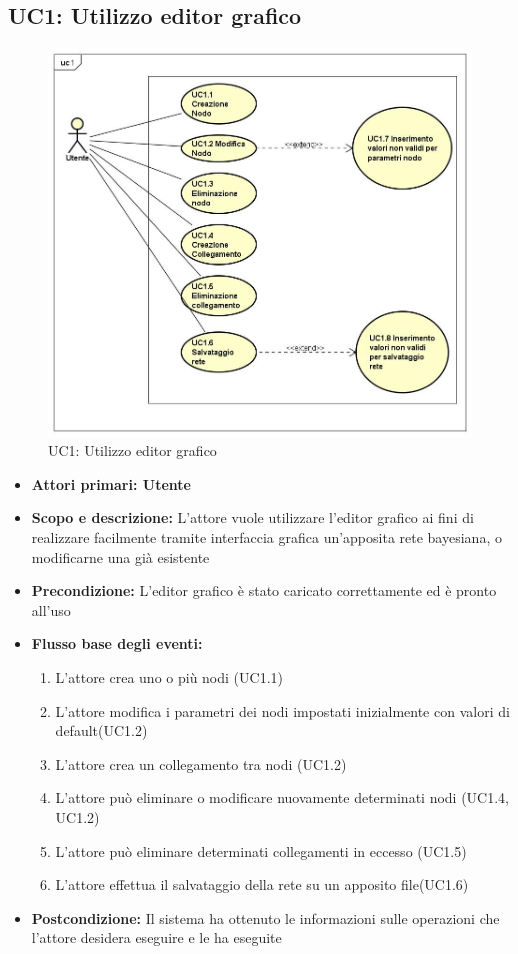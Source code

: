 \subsection{UC1: Utilizzo editor grafico} 
\begin{figure} [H]
	\centering
	\includegraphics[scale=0.45]{Img/UC1} 
	\caption{UC1: Utilizzo editor grafico} \label{} 
\end{figure} 
\begin{itemize} 
	\item{\textbf{Attori primari: Utente} } 
	\item{\textbf{Scopo e descrizione:} L'attore vuole utilizzare l'editor grafico ai fini di realizzare facilmente tramite interfaccia grafica un'apposita rete bayesiana, o modificarne una già esistente} 
	\item{\textbf{Precondizione:} L'editor grafico è stato caricato correttamente ed è pronto all'uso} 
	\item{\textbf{Flusso base degli eventi:} 
		\begin{enumerate} 
			\item{L'attore crea uno o più nodi (UC1.1)} 
			\item{L'attore modifica i parametri dei nodi impostati inizialmente con valori di default(UC1.2)} 
			\item{L'attore crea un collegamento tra nodi (UC1.2)} 
			\item{L'attore può eliminare o modificare nuovamente determinati nodi (UC1.4, UC1.2)} 
			\item{L'attore può eliminare determinati collegamenti in eccesso (UC1.5)} 
			\item{L'attore effettua il salvataggio della rete su un apposito file(UC1.6)} 
		\end{enumerate} 
	} 
	\item{\textbf{Postcondizione:} Il sistema ha ottenuto le informazioni sulle operazioni che l'attore desidera eseguire e le ha eseguite} 
\end{itemize} 
